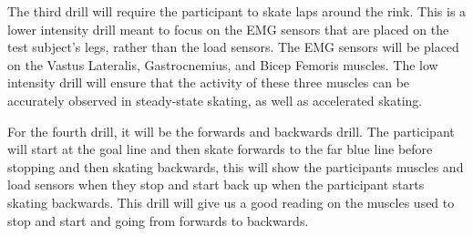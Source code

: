 The third drill will require the participant to skate laps around the rink. This is a lower intensity drill meant to focus on the EMG sensors that are placed on the test subject's legs, rather than the load sensors. The EMG sensors will be placed on the Vastus Lateralis, Gastrocnemius, and Bicep Femoris muscles. The low intensity drill will ensure that the activity of these three muscles can be accurately observed in steady-state skating, as well as accelerated skating. 

For the fourth drill, it will be the forwards and backwards drill. The participant will start at the goal line and then skate forwards to the far blue line before stopping and then skating backwards, this will show the participants muscles and load sensors when they stop and start back up when the participant starts skating backwards. This drill will give us a good reading on the muscles used to stop and start and going from forwards to backwards. 

